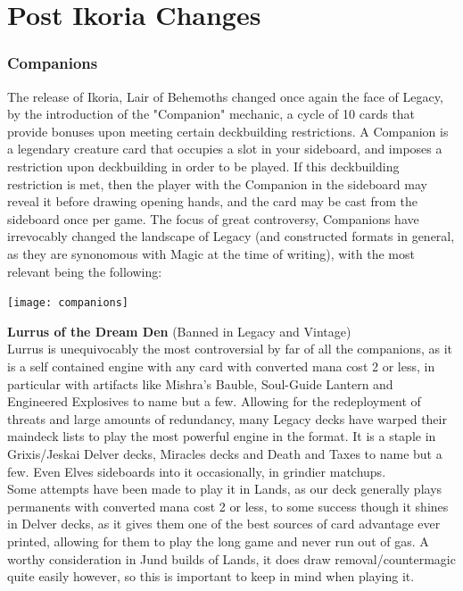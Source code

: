 \documentclass{report}
\begin{document}
\chapter{Post Ikoria Changes}
\subsection{Companions}
The release of Ikoria, Lair of Behemoths changed once again the face of Legacy, by the introduction of the "Companion" mechanic, a cycle of 10 cards that provide bonuses upon meeting certain deckbuilding restrictions. A Companion is a legendary creature card that occupies a slot in your sideboard, and imposes a restriction upon deckbuilding in order to be played. If this deckbuilding restriction is met, then the player with the Companion in the sideboard may reveal it before drawing opening hands, and the card may be cast from the sideboard once per game. The focus of great controversy, Companions have irrevocably changed the landscape of Legacy (and constructed formats in general, as they are synonomous with Magic at the time of writing), with the most relevant being the following:\\
\begin{center}
\texttt{[image: companions]}
\end{center}
\textbf{Lurrus of the Dream Den} (Banned in Legacy and Vintage)\\
Lurrus is unequivocably the most controversial by far of all the companions, as it is a self contained engine with any card with converted mana cost 2 or less, in particular with artifacts like Mishra's Bauble, Soul-Guide Lantern and Engineered Explosives to name but a few. Allowing for the redeployment of threats and large amounts of redundancy, many Legacy decks have warped their maindeck lists to play the most powerful engine in the format. It is a staple in Grixis/Jeskai Delver decks, Miracles decks and Death and Taxes to name but a few. Even Elves sideboards into it occasionally, in grindier matchups.\\
Some attempts have been made to play it in Lands, as our deck generally plays permanents with converted mana cost 2 or less, to some success though it shines in Delver decks, as it gives them one of the best sources of card advantage ever printed, allowing for them to play the long game and never run out of gas. A worthy consideration in Jund builds of Lands, it does draw removal/countermagic quite easily however, so this is important to keep in mind when playing it.\\\\
\end{document}
